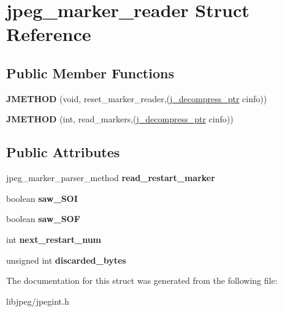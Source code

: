 \hypertarget{structjpeg__marker__reader}{\section{jpeg\-\_\-marker\-\_\-reader Struct Reference}
\label{structjpeg__marker__reader}
}
\subsection*{Public Member Functions}
\begin{DoxyCompactItemize}
\item 
\hypertarget{structjpeg__marker__reader_af23250da87f9da190c88459aa565f2b1}{{\bfseries J\-M\-E\-T\-H\-O\-D} (void, reset\-\_\-marker\-\_\-reader,(\hyperlink{structjpeg__decompress__struct}{j\-\_\-decompress\-\_\-ptr} cinfo))}\label{structjpeg__marker__reader_af23250da87f9da190c88459aa565f2b1}

\item 
\hypertarget{structjpeg__marker__reader_a6a2541cbeb37477c71ba6bc237e559a1}{{\bfseries J\-M\-E\-T\-H\-O\-D} (int, read\-\_\-markers,(\hyperlink{structjpeg__decompress__struct}{j\-\_\-decompress\-\_\-ptr} cinfo))}\label{structjpeg__marker__reader_a6a2541cbeb37477c71ba6bc237e559a1}

\end{DoxyCompactItemize}
\subsection*{Public Attributes}
\begin{DoxyCompactItemize}
\item 
\hypertarget{structjpeg__marker__reader_a23e67f5a0fa37ea69483dad72217123e}{jpeg\-\_\-marker\-\_\-parser\-\_\-method {\bfseries read\-\_\-restart\-\_\-marker}}\label{structjpeg__marker__reader_a23e67f5a0fa37ea69483dad72217123e}

\item 
\hypertarget{structjpeg__marker__reader_ad67711d91054e97e76fbe5254aac644c}{boolean {\bfseries saw\-\_\-\-S\-O\-I}}\label{structjpeg__marker__reader_ad67711d91054e97e76fbe5254aac644c}

\item 
\hypertarget{structjpeg__marker__reader_a1bf77ef7dfb6dfe58a03d041eb0dcd40}{boolean {\bfseries saw\-\_\-\-S\-O\-F}}\label{structjpeg__marker__reader_a1bf77ef7dfb6dfe58a03d041eb0dcd40}

\item 
\hypertarget{structjpeg__marker__reader_aac8d40171c73a18f129cd1b62d2fd06b}{int {\bfseries next\-\_\-restart\-\_\-num}}\label{structjpeg__marker__reader_aac8d40171c73a18f129cd1b62d2fd06b}

\item 
\hypertarget{structjpeg__marker__reader_ad29dee6159ab74f195fe5d88139306ce}{unsigned int {\bfseries discarded\-\_\-bytes}}\label{structjpeg__marker__reader_ad29dee6159ab74f195fe5d88139306ce}

\end{DoxyCompactItemize}


The documentation for this struct was generated from the following file\-:\begin{DoxyCompactItemize}
\item 
libjpeg/jpegint.\-h\end{DoxyCompactItemize}
